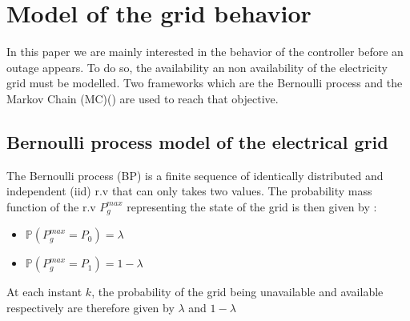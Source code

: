 \documentclass{ifacconf}
\begin{document}
\section {Model of the grid behavior}\label{ModelGriBeh}
 In this paper we are mainly interested in the behavior of the controller before an outage appears. To do so, the availability an non availability of the electricity grid must be modelled.  Two frameworks which are the Bernoulli process  and the Markov Chain (MC)(\cite{RBiRna1992}) are used to reach that objective.
 \subsection{Bernoulli process model of the electrical grid}
 The Bernoulli process (BP) is a finite sequence of identically distributed and independent (iid) r.v that can only takes two values. The probability mass function of the r.v  $P_g^{max}$ representing the state of the  grid is then given by :
  \begin{itemize}
\item $\mathbb{P}(P_g^{max} = P_0) = \lambda $
\item $\mathbb{P}(P_g^{max} = P_1)= 1-\lambda $ 
\end{itemize}
At each instant $k$, the probability of the grid being unavailable and available respectively are therefore given by $\lambda$ and $ 1-\lambda$
\end{document}
